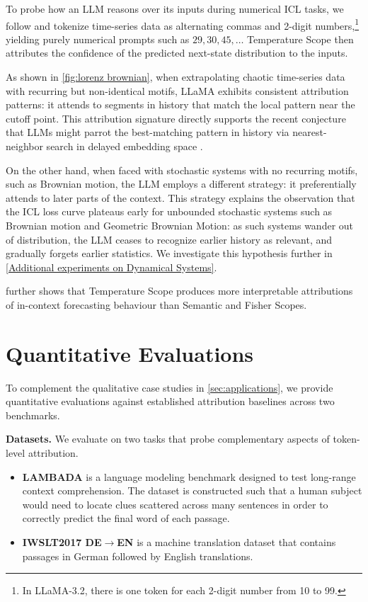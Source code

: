 \documentclass{article}
\begin{document}
To probe how an LLM reasons over its inputs during numerical ICL tasks,
we follow \citet{gruver2024largelanguagemodelszeroshot} and tokenize time-series data as alternating commas and 2-digit numbers,\footnote{In LLaMA-3.2, there is one token for each 2-digit number from 10 to 99.}
yielding purely numerical prompts such as $29,30,45,\ldots$
Temperature Scope then attributes the confidence of the predicted next-state distribution to the inputs.

As shown in \cref{fig:lorenz brownian}, 
when extrapolating chaotic time-series data with recurring but non-identical motifs,
LLaMA exhibits consistent attribution patterns: it attends to segments in history that match the local pattern near the cutoff point.
This attribution signature directly supports the recent conjecture that LLMs might parrot the best-matching pattern
in history via nearest-neighbor search in delayed embedding space \cite{zhang2025contextparrotingsimpletoughtobeat}.

On the other hand, when faced with stochastic systems with no recurring motifs, 
such as Brownian motion, the LLM employs a different strategy: it preferentially attends to later parts of the context. This strategy explains the observation \cite{liu-etal-2024-llms-learn} that the ICL loss curve plateaus early for unbounded stochastic systems such as Brownian motion and Geometric Brownian Motion: as such systems wander out of distribution, the LLM ceases to recognize earlier history as relevant, and gradually forgets earlier statistics. 
We investigate this hypothesis further in \cref{Additional experiments on Dynamical Systems}.

 further shows that Temperature Scope produces more interpretable attributions of in-context forecasting behaviour than Semantic and Fisher Scopes.


\section{Quantitative Evaluations}
\label{sec:evaluation}

To complement the qualitative case studies in \cref{sec:applications}, 
we provide quantitative evaluations against established attribution baselines across two benchmarks.

\noindent\textbf{Datasets.}
We evaluate on two tasks that probe complementary aspects of token-level attribution.
\begin{itemize}
    \item \textbf{LAMBADA} \cite{paperno-etal-2016-lambada} is a language modeling benchmark designed to test long-range context comprehension. 
    The dataset is constructed such that a human subject would need to locate clues scattered across many sentences in order to correctly predict the final word of each passage.
    \item \textbf{IWSLT2017 DE$\to$EN} \cite{cettolo-etal-2017-overview} is a machine translation dataset that contains passages in German followed by English translations.

\end{itemize}
\end{document}

